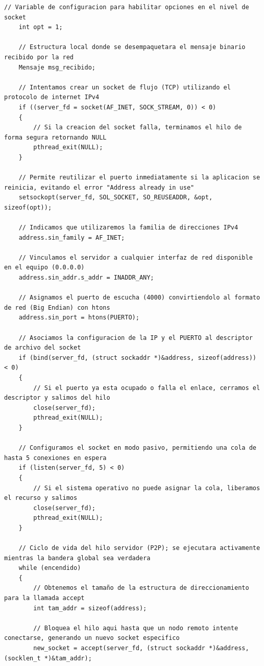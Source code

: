 \begin{lstlisting}[style=estiloC, caption={Archivo del Back-End (conexion P2P)}]
    // Variable de configuracion para habilitar opciones en el nivel de socket
    int opt = 1;

    // Estructura local donde se desempaquetara el mensaje binario recibido por la red
    Mensaje msg_recibido;

    // Intentamos crear un socket de flujo (TCP) utilizando el protocolo de internet IPv4
    if ((server_fd = socket(AF_INET, SOCK_STREAM, 0)) < 0)
    {
        // Si la creacion del socket falla, terminamos el hilo de forma segura retornando NULL
        pthread_exit(NULL);
    }

    // Permite reutilizar el puerto inmediatamente si la aplicacion se reinicia, evitando el error "Address already in use"
    setsockopt(server_fd, SOL_SOCKET, SO_REUSEADDR, &opt, sizeof(opt));

    // Indicamos que utilizaremos la familia de direcciones IPv4
    address.sin_family = AF_INET;

    // Vinculamos el servidor a cualquier interfaz de red disponible en el equipo (0.0.0.0)
    address.sin_addr.s_addr = INADDR_ANY;

    // Asignamos el puerto de escucha (4000) convirtiendolo al formato de red (Big Endian) con htons
    address.sin_port = htons(PUERTO);

    // Asociamos la configuracion de la IP y el PUERTO al descriptor de archivo del socket
    if (bind(server_fd, (struct sockaddr *)&address, sizeof(address)) < 0)
    {
        // Si el puerto ya esta ocupado o falla el enlace, cerramos el descriptor y salimos del hilo
        close(server_fd);
        pthread_exit(NULL);
    }

    // Configuramos el socket en modo pasivo, permitiendo una cola de hasta 5 conexiones en espera
    if (listen(server_fd, 5) < 0)
    {
        // Si el sistema operativo no puede asignar la cola, liberamos el recurso y salimos
        close(server_fd);
        pthread_exit(NULL);
    }

    // Ciclo de vida del hilo servidor (P2P); se ejecutara activamente mientras la bandera global sea verdadera
    while (encendido)
    {
        // Obtenemos el tamaño de la estructura de direccionamiento para la llamada accept
        int tam_addr = sizeof(address);

        // Bloquea el hilo aqui hasta que un nodo remoto intente conectarse, generando un nuevo socket especifico
        new_socket = accept(server_fd, (struct sockaddr *)&address, (socklen_t *)&tam_addr);


\end{lstlisting}
